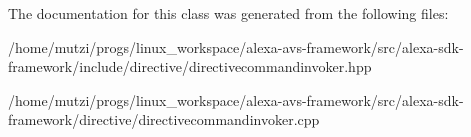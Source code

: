 The documentation for this class was generated from the following files\+:\begin{DoxyCompactItemize}
\item 
/home/mutzi/progs/linux\+\_\+workspace/alexa-\/avs-\/framework/src/alexa-\/sdk-\/framework/include/directive/directivecommandinvoker.\+hpp\item 
/home/mutzi/progs/linux\+\_\+workspace/alexa-\/avs-\/framework/src/alexa-\/sdk-\/framework/directive/directivecommandinvoker.\+cpp\end{DoxyCompactItemize}
